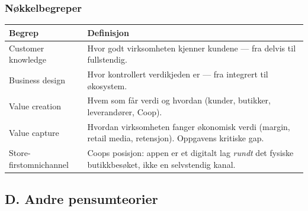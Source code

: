 \subsubsection*{Nøkkelbegreper}

\begin{tabular}{p{3.8cm}p{12cm}}
\hline
\textbf{Begrep} & \textbf{Definisjon} \\
\hline
Customer knowledge & Hvor godt virksomheten kjenner kundene --- fra delvis til
fullstendig. \\
\hline
Business design & Hvor kontrollert verdikjeden er --- fra integrert til
økosystem. \\
\hline
Value creation & Hvem som får verdi og hvordan (kunder, butikker, leverandører,
Coop). \\
\hline
Value capture & Hvordan virksomheten fanger økonomisk verdi (margin, retail
media, retensjon). Oppgavens kritiske gap. \\
\hline
Store-first\newline omnichannel & Coops posisjon: appen er et digitalt lag
\emph{rundt} det fysiske butikkbesøket, ikke en selvstendig kanal. \\
\hline
\end{tabular}

\subsection*{D. Andre pensumteorier}

